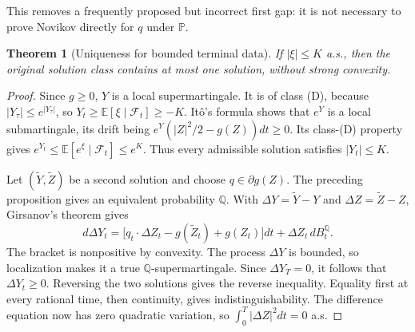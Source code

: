 \documentclass[11pt,a4paper]{article}
\newcommand{\E}{\mathbb E}
\newcommand{\Pp}{\mathbb P}
\newcommand{\Q}{\mathbb Q}
\newcommand{\F}{\mathcal F}
\newtheorem{theorem}{Theorem}
\theoremstyle{definition}
\begin{document}
This removes a frequently proposed but incorrect first gap: it is not necessary to prove Novikov directly for $q$ under $\Pp$.

\begin{theorem}[Uniqueness for bounded terminal data]
If $|\xi|\le K$ a.s., then the original solution class contains at most one solution, without strong convexity.
\end{theorem}
\begin{proof}
Since $g\ge0$, $Y$ is a local supermartingale. It is of class (D), because $|Y_\tau|\le e^{|Y_\tau|}$, so
$Y_t\ge\E[\xi\mid\F_t]\ge-K$.
It\^o's formula shows that $e^Y$ is a local submartingale, its drift being
$e^Y(|Z|^2/2-g(Z))dt\ge0$. Its class-(D) property gives
$e^{Y_t}\le\E[e^\xi\mid\F_t]\le e^K$.
Thus every admissible solution satisfies $|Y_t|\le K$.

Let $(\widetilde Y,\widetilde Z)$ be a second solution and choose $q\in\partial g(Z)$. The preceding proposition gives an equivalent probability $\Q$. With $\Delta Y=\widetilde Y-Y$ and $\Delta Z=\widetilde Z-Z$, Girsanov's theorem gives
\[
 d\Delta Y_t=
 \bigl[q_t\cdot\Delta Z_t-g(\widetilde Z_t)+g(Z_t)\bigr]dt
       +\Delta Z_t\,dB_t^{\Q}.
\]
The bracket is nonpositive by convexity. The process $\Delta Y$ is bounded, so localization makes it a true $\Q$-supermartingale. Since $\Delta Y_T=0$, it follows that $\Delta Y_t\ge0$. Reversing the two solutions gives the reverse inequality. Equality first at every rational time, then continuity, gives indistinguishability. The difference equation now has zero quadratic variation, so $\int_0^T|\Delta Z|^2dt=0$ a.s.
\end{proof}
\end{document}
